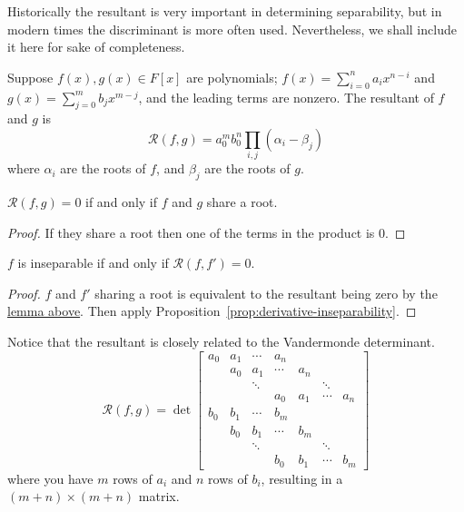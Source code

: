\begin{remark}
    Historically the resultant is very important in determining separability,
    but in modern times the discriminant is more often used.
    Nevertheless, we shall include it here for sake of completeness.
\end{remark}
\begin{definition}
    Suppose \(f(x),g(x) \in F[x]\) are polynomials;
    \(f(x) = \sum_{i=0}^n a_i x^{n-i}\) and \(g(x) = \sum_{j=0}^m b_j x^{m-j}\),
    and the leading terms are nonzero.
    The resultant of \(f\) and \(g\) is
    \begin{equation*}
        \mathcal{R}(f,g) = a_0^m b_0^n \prod_{i,j} (\alpha_i - \beta_j)
    \end{equation*}
    where \(\alpha_i\) are the roots of \(f\),
    and \(\beta_j\) are the roots of \(g\).
\end{definition}
\begin{lemma}\label{lem:resultant-zero}
    \(\mathcal{R}(f,g) = 0\) if and only if \(f\) and \(g\) share a root.
\end{lemma}
\begin{proof}
    If they share a root then one of the terms in the product is 0.
\end{proof}
\begin{corollary}
    \(f\) is inseparable if and only if \(\mathcal{R}(f,f') = 0\).
\end{corollary}
\begin{proof}
    \(f\) and \(f'\) sharing a root is equivalent to
    the resultant being zero by the \hyperref[lem:resultant-zero]{lemma above}.
    Then apply Proposition~\ref{prop:derivative-inseparability}.
\end{proof}
\begin{remark}
    Notice that the resultant is closely related to the Vandermonde determinant.
    \begin{equation*}
        \mathcal{R}(f,g) = \det
        \begin{bmatrix}
            a_0 & a_1 & \cdots & a_n \\
            & a_0 & a_1 & \cdots & a_n \\
            & & \ddots & & & \ddots \\
            & & & a_0 & a_1 & \cdots & a_n \\
            b_0 & b_1 & \cdots & b_m \\
            & b_0 & b_1 & \cdots & b_m \\
            & & \ddots & & & \ddots \\
            & & & b_0 & b_1 & \cdots & b_m
        \end{bmatrix}
    \end{equation*}
    where you have \(m\) rows of \(a_i\) and \(n\) rows of \(b_i\),
    resulting in a \((m+n)\times(m+n)\) matrix.
\end{remark}

